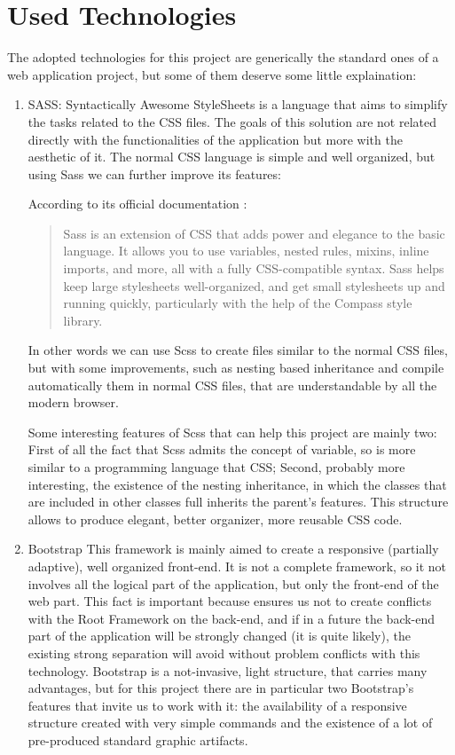 \section{Used Technologies}

The adopted technologies for this project are generically the standard ones of a web application project, but some of them deserve some little explaination:

\begin{enumerate}

\item
SASS:
Syntactically Awesome StyleSheets is a language that aims to simplify the tasks related to the CSS files. The goals of this solution are not related directly with the functionalities of the application but more with the aesthetic of it.
The normal CSS language is simple and well organized, but using Sass we can further improve its features:

According to its official documentation :
\begin{quote}
Sass is an extension of CSS that adds power and elegance to the basic language. It allows you to use variables, nested rules, mixins, inline imports, and more, all with a fully CSS-compatible syntax. Sass helps keep large stylesheets well-organized, and get small stylesheets up and running quickly, particularly with the help of the Compass style library.

\end{quote}

In other words we can use Scss to create files similar to the normal CSS files, but with some improvements, such as nesting based inheritance and compile automatically them in normal CSS files, that are understandable by all the modern browser.

Some interesting features of Scss that can help this project are mainly two:
First of all the fact that Scss admits the concept of variable, so is more similar to a programming language that CSS; Second, probably more interesting, the existence of the nesting inheritance, in which the classes that are included in other classes full inherits the parent's features. This structure allows to produce elegant, better organizer, more reusable CSS code.

\item
Bootstrap
This framework is mainly aimed to create a responsive (partially adaptive), well organized front-end. It is not a complete framework, so it not involves all the logical part of the application, but only the front-end of the web part. This fact is important because ensures us not to create conflicts with the Root Framework on the back-end, and if in a future the back-end part of the application will be strongly changed (it is quite likely), the existing strong separation will avoid without problem conflicts with this technology. Bootstrap is a not-invasive, light structure, that carries many advantages, but for this project there are in particular two Bootstrap's features that invite us to work with it: the availability of a responsive structure created with very simple commands and the existence of a lot of pre-produced standard graphic artifacts. 


\end{enumerate}
